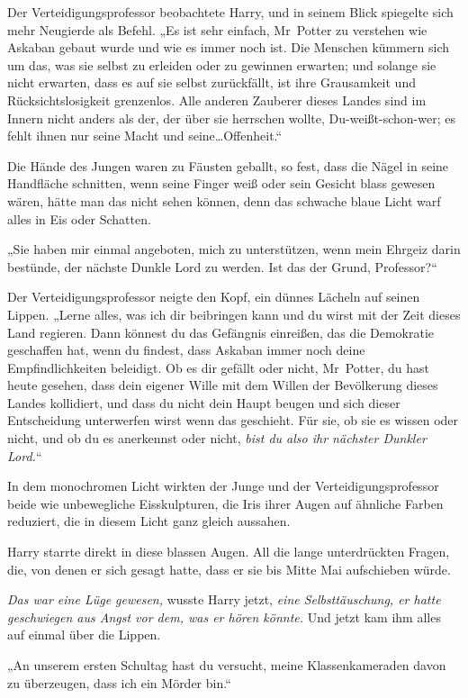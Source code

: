 {Der Verteidigungsprofessor beobachtete Harry, und in seinem Blick spiegelte sich mehr Neugierde als Befehl. „Es ist sehr einfach, Mr~Potter zu verstehen wie Askaban gebaut wurde und wie es immer noch ist. Die Menschen kümmern sich um das, was sie selbst zu erleiden oder zu gewinnen erwarten; und solange sie nicht erwarten, dass es auf sie selbst zurückfällt, ist ihre Grausamkeit und Rücksichtslosigkeit grenzenlos. Alle anderen Zauberer dieses Landes sind im Innern nicht anders als der, der über sie herrschen wollte, Du-weißt-schon-wer; es fehlt ihnen nur seine Macht und seine…Offenheit.“

Die Hände des Jungen waren zu Fäusten geballt, so fest, dass die Nägel in seine Handfläche schnitten, wenn seine Finger weiß oder sein Gesicht blass gewesen wären, hätte man das nicht sehen können, denn das schwache blaue Licht warf alles in Eis oder Schatten.

„Sie haben mir einmal angeboten, mich zu unterstützen, wenn mein Ehrgeiz darin bestünde, der nächste Dunkle Lord zu werden. Ist das der Grund, Professor?“

Der Verteidigungsprofessor neigte den Kopf, ein dünnes Lächeln auf seinen Lippen. „Lerne alles, was ich dir beibringen kann und du wirst mit der Zeit dieses Land regieren. Dann könnest du das Gefängnis einreißen, das die Demokratie geschaffen hat, wenn du findest, dass Askaban immer noch deine Empfindlichkeiten beleidigt. Ob es dir gefällt oder nicht, Mr~Potter, du hast heute gesehen, dass dein eigener Wille mit dem Willen der Bevölkerung dieses Landes kollidiert, und dass du nicht dein Haupt beugen und sich dieser Entscheidung unterwerfen wirst wenn das geschieht. Für sie, ob sie es wissen oder nicht, und ob du es anerkennst oder nicht, \emph{bist du also ihr nächster Dunkler Lord.}“

In dem monochromen Licht wirkten der Junge und der Verteidigungsprofessor beide wie unbewegliche Eisskulpturen, die Iris ihrer Augen auf ähnliche Farben reduziert, die in diesem Licht ganz gleich aussahen.

Harry starrte direkt in diese blassen Augen. All die lange unterdrückten Fragen, die, von denen er sich gesagt hatte, dass er sie bis Mitte Mai aufschieben würde.

\emph{Das war eine Lüge gewesen,} wusste Harry jetzt, \emph{eine Selbsttäuschung, er hatte geschwiegen aus Angst vor dem, was er hören könnte.} Und jetzt kam ihm alles auf einmal über die Lippen.

„An unserem ersten Schultag hast du versucht, meine Klassenkameraden davon zu überzeugen, dass ich ein Mörder bin.“

}
